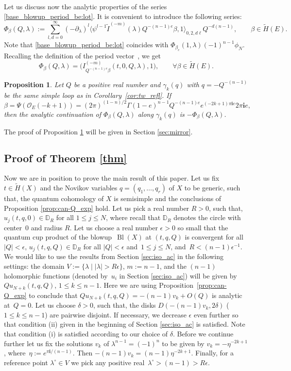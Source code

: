 \documentclass[10pt,a4paper]{article}
\numberwithin{equation}{section}
\newtheorem{Proposition}[Theorem]{Proposition}
\newcommand{\ii}{\mathbf{i}}
\renewcommand{\O}{\mathcal{O}}
\begin{document}
Let us discuss now the analytic properties of the series \eqref{base_blowup_period_be:lot}. It is convenient to introduce the following series:
\[
\Phi_\beta(Q,\lambda) :=
\sum_{l,d=0}^\infty
(-\partial_\lambda)^l \big\langle
\psi^{l-1} \widetilde{I}^{(-m)}(\lambda)Q^{-(n-1)e}\beta, 1
\big\rangle_{0,2,d\ell}
 Q^{-d(n-1)},\qquad \beta\in\widetilde{H}(E).
\]
Note that \eqref{base_blowup_period_be:lot} coincides with $\Phi_{\beta_e}(1,\lambda) (-1)^{n-1}\phi_N$. Recalling the definition of the period vector~, we get
\[
\Phi_\beta (Q,\lambda)=\big(I^{(-m)}_{Q^{-(n-1)e}\beta}(t,0,Q,\lambda),1\big),
\qquad
\forall \beta \in \widetilde{H}(E).
\]
\begin{Proposition}\label{prop:mon_Phi}
Let $Q$ be a positive real number and $\gamma_k(q)$ with $q=-Q^{-(n-1)}$ be the same simple loop as in Corollary~{\rm\ref{cor:tw_refl}}. If
\[
\beta=\Psi(\O_E(-k+1))=
(2\pi)^{(1-n)/2}
\Gamma(1-e)^{n-1}
Q^{-(n-1) e}
e^{(-2k+1)\pi\ii e}
2\pi \ii e,
\]
then the analytic continuation of $\Phi_\beta(Q,\lambda)$ along $\gamma_k(q)$ is $-\Phi_\beta(Q,\lambda)$.
\end{Proposition}
The proof of Proposition \ref{prop:mon_Phi} will be given in Section
\ref{sec:mirror}.
\subsection{Proof of Theorem \ref{thm}}
Now we are in position to prove the main result of this paper. Let us fix $t\in \widetilde{H}(X)$ and the Novikov variables $q=(q_1,\dots,q_r)$ of $X$ to be generic, such that, the quantum cohomology of $X$ is semisimple and the conclusions of Proposition \ref{prop:can-Q_exp} hold. Let us pick a real number $R>0$, such that, $u_j(t,q,0)\in \mathbb{D}_R$ for all $1\leq j\leq N$, where recall that $\mathbb{D}_R$ denotes the circle with center~$0$ and radius $R$. Let us choose a real number $\epsilon>0$ so small that the quantum cup product of the blowup~$\operatorname{Bl}(X)$ at $(t,q,Q)$ is convergent for all $|Q|<\epsilon$, $u_j(t,q,Q)\in \mathbb{D}_R$ for all $|Q|<\epsilon$ and~$1\leq j\leq N$, and~$R<(n-1)\epsilon^{-1}$. We would like to use the results from Section \eqref{sec:iso_ac} in the following settings: the domain $V:= \{\lambda\mid  |\lambda|>R\epsilon \}$, $m:=n-1$, and the $(n-1)$ holomorphic functions (denoted by~$u_i$ in Section \ref{sec:iso_ac}) will be given by $Qu_{N+k}(t,q,Q)$, $1\leq k\leq n-1$. Here we are using Proposition~\ref{prop:can-Q_exp} to conclude that $Q u_{N+k}(t,q,Q)=-(n-1)v_k + O(Q)$ is analytic at~${Q=0}$. Let us choose $\delta>0$, such that, the disks $D(-(n-1)v_k,2\delta)$ ($1\leq k\leq n-1$) are pairwise disjoint. If necessary, we decrease $\epsilon$ even further so that condition (ii) given in the beginning of Section \ref{sec:iso_ac} is satisfied. Note that condition (i) is satisfied according to our choice of $\delta$. Before we continue further let us fix the solutions $v_k$ of $\lambda^{n-1}=(-1)^n$ to be given by $v_k=-\eta^{-2k+1}$, where~${\eta:=e^{\pi\ii/(n-1)}}$. Then $-(n-1)v_k =(n-1) \eta^{-2k+1}$. Finally, for a reference point $\lambda^\circ\in V$ we pick any positive real~${\lambda^\circ>(n-1)>R\epsilon}$.
\end{document}
